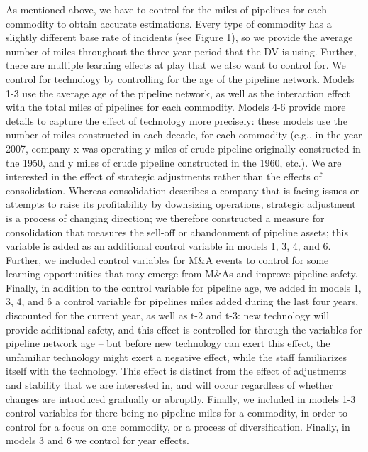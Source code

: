As mentioned above, we have to control for the miles of pipelines for each commodity to obtain accurate estimations. Every type of commodity has a slightly different base rate of incidents (see Figure 1), so we provide the average number of miles throughout the three year period that the DV is using. Further, there are multiple learning effects at play that we also want to control for. We control for technology by controlling for the age of the pipeline network. Models 1-3 use the average age of the pipeline network, as well as the interaction effect with the total miles of pipelines for each commodity. Models 4-6 provide more details to capture the effect of technology more precisely: these models use the number of miles constructed in each decade, for each commodity (e.g., in the year 2007, company x was operating y miles of crude pipeline originally constructed in the 1950, and y miles of crude pipeline constructed in the 1960, etc.). We are interested in the effect of strategic adjustments rather than the effects of consolidation. Whereas consolidation describes a company that is facing issues or attempts to raise its profitability by downsizing operations, strategic adjustment is a process of changing direction; we therefore constructed a measure for consolidation that measures the sell-off or abandonment of pipeline assets; this variable is added as an additional control variable in models 1, 3, 4, and 6. Further, we included control variables for M\&A events to control for some learning opportunities that may emerge from M\&As and improve pipeline safety. Finally, in addition to the control variable for pipeline age, we added in models 1, 3, 4, and 6 a control variable for pipelines miles added during the last four years, discounted for the current year, as well as t-2 and t-3: new technology will provide additional safety, and this effect is controlled for through the variables for pipeline network age -- but before new technology can exert this effect, the unfamiliar technology might exert a negative effect, while the staff familiarizes itself with the technology. This effect is distinct from the effect of adjustments and stability that we are interested in, and will occur regardless of whether changes are introduced gradually or abruptly. Finally, we included in models 1-3 control variables for there being no pipeline miles for a commodity, in order to control for a focus on one commodity, or a process of diversification. Finally, in models 3 and 6 we control for year effects.